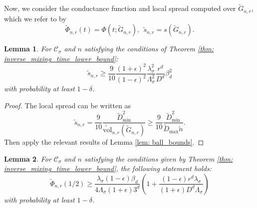 \documentclass{article}
\newcommand{\vol}{\mathrm{vol}}
\newcommand{\1}{\mathbf{1}}
\newcommand{\Cset}{\mathcal{C}}
\newcommand{\Csig}{\Cset_{\sigma}}
\newcommand{\wn}{\widetilde{n}}
\theoremstyle{aldenthm}
\newtheorem{lemma}{Lemma}
\begin{document}
Now, we consider the conductance function and local spread computed over $\widetilde{G}_{n,r}$, which we refer to by
\begin{equation*}
\widetilde{\Phi}_{n,r}(t) = \Phi(t; \widetilde{G}_{n,r}), ~~ \widetilde{s}_{n,r} = s(\widetilde{G}_{n,r}).
\end{equation*}

\begin{lemma}
	\label{lem: local_spread_lower_bound}
	For $\Csig$ and $n$ satisfying the conditions of Theorem \ref{thm: inverse_mixing_time_lower_bound}:
	\begin{equation*}
	\widetilde{s}_{n,r} \geq \frac{9}{10} \frac{(1 + \epsilon)^2}{(1 - \epsilon)^2}\frac{\lambda_{\sigma}^2}{\Lambda_{\sigma}^2} \frac{r^d}{D^d} \beta_d^2
	\end{equation*}
	with probability at least $1 - \delta$. 
\end{lemma}

\begin{proof}
	The local spread can be written as
	\begin{equation*}
	\widetilde{s}_{n,r} = \frac{9}{10} \frac{\widetilde{D}_{\min}^2}{\widetilde{\vol}_{n,r}(\widetilde{G}_{n,r})} \geq  \frac{9}{10} \frac{\widetilde{D}_{\min}^2}{\widetilde{D}_{\max} \wn}.
	\end{equation*}
	Then apply the relevant results of Lemma \ref{lem: ball_bounds}.
\end{proof}

\begin{lemma}
	\label{lem: non_convex_conductance_lower_bound}
	For $\Csig$ and $n$ satisfying the conditions given by Theorem \ref{thm: inverse_mixing_time_lower_bound}, the following statement holds:
	\begin{equation*}
	\widetilde{\Phi}_{n,r}(1/2) \geq \frac{\lambda_{\sigma}(1 - \epsilon)\beta_d}{4\Lambda_{\sigma}(1 + \epsilon)3^d} \left(1 + \frac{(1 - \epsilon)r^d\lambda_{\sigma}}{(1 + \epsilon)D^d\Lambda_{\sigma}}\right)
	\end{equation*}
	with probability at least $1 - \delta$.
\end{lemma}
\end{document}
